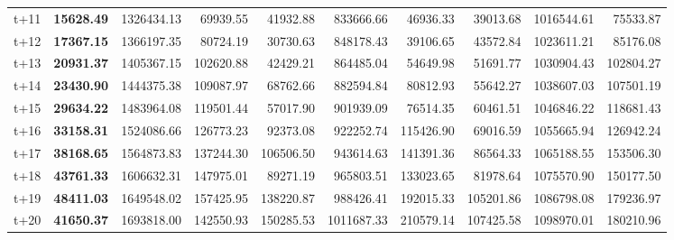 \begin{table}[H]
\begin{tabular}{lrrrrrrrrr}
t+11  & \textbf{15628.49}  & 1326434.13  & 69939.55  & 41932.88  & 833666.66  & 46936.33  & 39013.68  & 1016544.61  & 75533.87  \\
t+12  & \textbf{17367.15}  & 1366197.35  & 80724.19  & 30730.63  & 848178.43  & 39106.65  & 43572.84  & 1023611.21  & 85176.08  \\
t+13  & \textbf{20931.37}  & 1405367.15  & 102620.88  & 42429.21  & 864485.04  & 54649.98  & 51691.77  & 1030904.43  & 102804.27  \\
t+14  & \textbf{23430.90}  & 1444375.38  & 109087.97  & 68762.66  & 882594.84  & 80812.93  & 55642.27  & 1038607.03  & 107501.19  \\
t+15  & \textbf{29634.22}  & 1483964.08  & 119501.44  & 57017.90  & 901939.09  & 76514.35  & 60461.51  & 1046846.22  & 118681.43  \\
t+16  & \textbf{33158.31}  & 1524086.66  & 126773.23  & 92373.08  & 922252.74  & 115426.90  & 69016.59  & 1055665.94  & 126942.24  \\
t+17  & \textbf{38168.65}  & 1564873.83  & 137244.30  & 106506.50  & 943614.63  & 141391.36  & 86564.33  & 1065188.55  & 153506.30  \\
t+18  & \textbf{43761.33}  & 1606632.31  & 147975.01  & 89271.19  & 965803.51  & 133023.65  & 81978.64  & 1075570.90  & 150177.50  \\
t+19  & \textbf{48411.03}  & 1649548.02  & 157425.95  & 138220.87  & 988426.41  & 192015.33  & 105201.86  & 1086798.08  & 179236.97  \\
t+20  & \textbf{41650.37}  & 1693818.00  & 142550.93  & 150285.53  & 1011687.33  & 210579.14  & 107425.58  & 1098970.01  & 180210.96  \\

\bottomrule
\end{tabular}
\end{table}
